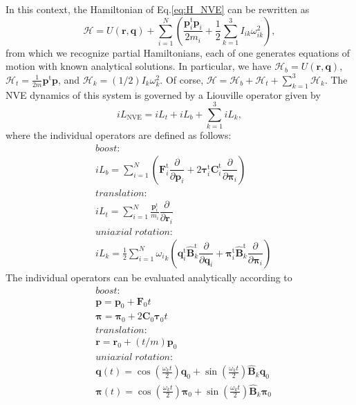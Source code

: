 \documentclass[aip,jcp,reprint,amsmath,amssymb]{revtex4-1}
\newcommand{\mt}[1]{\boldsymbol{\mathbf{#1}}}           %
\newcommand{\vt}[1]{\boldsymbol{\mathbf{#1}}}           %
\newcommand{\tr}[1]{#1^\text{t}}                        %
\newcommand{\diff}[2]{\dfrac{\partial #1}{\partial #2}} %
\begin{document}
In this context, the Hamiltonian of Eq.\eqref{eq:H_NVE} can be rewritten as
\begin{equation}
\label{eq:H_split_omega}
\mathcal{H} =  U(\vt r, \vt q) +  \sum_{i=1}^N \left( \frac{\tr{\vt p_i} \vt p_i}{2m_i} + \frac{1}{2} \sum_{k=1}^3 I_{ik} \omega_{ik}^2\right),
\end{equation}
from which we recognize partial Hamiltonians, each of one generates equations of motion with known analytical solutions. In particular, we have $\mathcal{H}_b = U(\vt r, \vt q)$, $\mathcal{H}_{t} = \frac{1}{2m}\tr{\vt p} \vt p$, and $\mathcal{H}_k = (1/2) I_k \omega_k^2$. Of corse, $\mathcal{H} = \mathcal{H}_b + \mathcal{H}_t + \sum_{k=1}^3 \mathcal{H}_k$. The NVE dynamics of this system is governed by a Liouville operator given by\cite{Abreu_2017}
\begin{equation}
\label{eq:full_operator}
i\!L_\text{NVE} = i\!L_t + i\!L_b + \sum_{k=1}^3 i\!L_k,
\end{equation}
where the individual operators are defined as follows:
\[
\begin{split}
&boost:\\
&i\!L_b = \sum_{i=1}^N \left( \tr{\vt F}_i \diff{}{\vt p_i} + 2 \tr{\vt \tau}_i \tr{\mt C}_i \diff{}{\vt \pi_i} \right) \\
&translation: \\
& i\!L_t = \sum_{i=1}^N \frac{\tr{\vt p}_i}{m_i}\diff{}{\vt r_i} \\
&uniaxial \; rotation:\\
& i\!L_k = \frac{1}{2} \sum_{i=1}^N {\omega_i}_k \left( \tr{\vt q}_i\tr{\hat{\mt B}_k} \diff{}{\vt q_i} + \tr{\vt \pi_i}\tr{\hat{\mt B}_k} \diff{}{\vt \pi_i} \right)
\end{split}
\]
The individual operators can be evaluated analytically according to
\[
\begin{split}
&boost:\\
&{\vt p} = {\vt p}_0 + {\vt F}_0 t \\
&{\vt \pi} = {\vt \pi}_0 +  2 {\mt C}_0 {\vt \tau}_0 t\\
&translation:\\
&{\vt r} = {\vt r}_0 + (t/m) {\vt p}_0\\
&uniaxial \; rotation:\\
&{\vt q}(t) = \cos\left(\frac{\omega_k t}{2}\right) \vt q_0 + \sin\left(\frac{\omega_k t}{2}\right) \hat{\mt B}_k \vt q_0 \\
&{\vt \pi}(t) = \cos\left(\frac{\omega_k t}{2}\right) \vt \pi_0 + \sin\left(\frac{\omega_k t}{2}\right) \hat{\mt B}_k \vt \pi_0
\end{split}
\]
\end{document}
